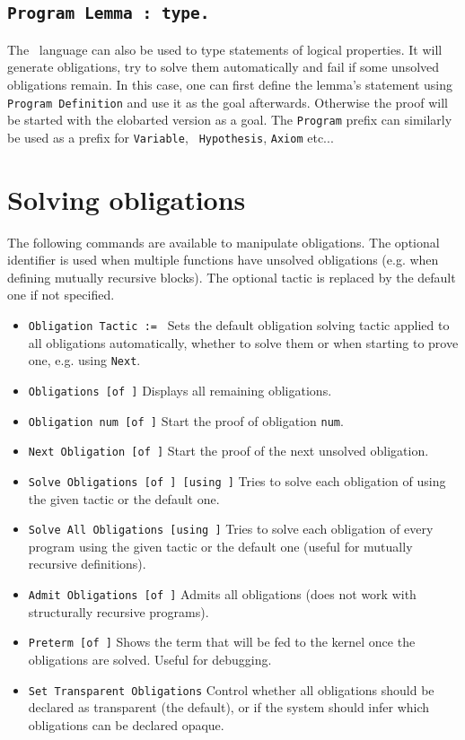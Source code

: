 \subsection{\tt Program Lemma {\ident} : type.
  \label{ProgramLemma}}

The \Russell\ language can also be used to type statements of logical
properties. It will generate obligations, try to solve them
automatically and fail if some unsolved obligations remain. 
In this case, one can first define the lemma's
statement using {\tt Program Definition} and use it as the goal afterwards.
Otherwise the proof will be started with the elobarted version as a goal.
The {\tt Program} prefix can similarly be used as a prefix for {\tt Variable}, {\tt
  Hypothesis}, {\tt Axiom} etc...

\section{Solving obligations}
The following commands are available to manipulate obligations. The
optional identifier is used when multiple functions have unsolved
obligations (e.g. when defining mutually recursive blocks). The optional
tactic is replaced by the default one if not specified.

\begin{itemize}
\item {\tt Obligation Tactic := \tacexpr}
  Sets the default obligation
  solving tactic applied to all obligations automatically, whether to
  solve them or when starting to prove one, e.g. using {\tt Next}.
\item {\tt Obligations [of \ident]} Displays all remaining
  obligations.
\item {\tt Obligation num [of \ident]} Start the proof of
  obligation {\tt num}.
\item {\tt Next Obligation [of \ident]} Start the proof of the next
  unsolved obligation.
\item {\tt Solve Obligations [of \ident] [using
    \tacexpr]}
  Tries to solve
  each obligation of \ident using the given tactic or the default one.
\item {\tt Solve All Obligations [using \tacexpr]} Tries to solve
  each obligation of every program using the given tactic or the default
  one (useful for mutually recursive definitions).
\item {\tt Admit Obligations [of \ident]} 
  Admits all obligations (does not work with structurally recursive programs).
\item {\tt Preterm [of \ident]} 
  Shows the term that will be fed to
  the kernel once the obligations are solved. Useful for debugging.
\item {\tt Set Transparent Obligations}
  Control whether all obligations should be declared as transparent (the
  default), or if the system should infer which obligations can be declared opaque. 
\end{itemize}

